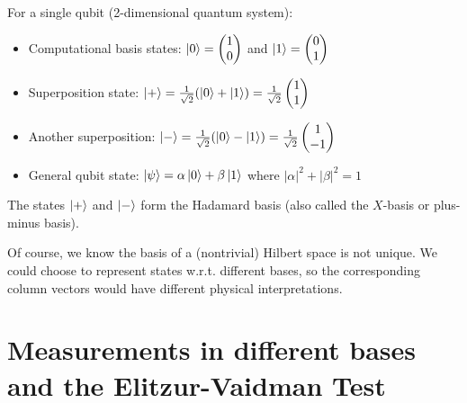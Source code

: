 \begin{example}
For a single qubit (2-dimensional quantum system):
\begin{itemize}
\item Computational basis states: $\ket{0} = \begin{pmatrix} 1 \\ 0 \end{pmatrix}$ and $\ket{1} = \begin{pmatrix} 0 \\ 1 \end{pmatrix}$

\item Superposition state: $\ket{+} = \frac{1}{\sqrt{2}}(\ket{0} + \ket{1}) = \frac{1}{\sqrt{2}}\begin{pmatrix} 1 \\ 1 \end{pmatrix}$

\item Another superposition: $\ket{-} = \frac{1}{\sqrt{2}}(\ket{0} - \ket{1}) = \frac{1}{\sqrt{2}}\begin{pmatrix} 1 \\ -1 \end{pmatrix}$

\item General qubit state: $\ket{\psi} = \alpha\ket{0} + \beta\ket{1}$ where $|\alpha|^2 + |\beta|^2 = 1$
\end{itemize}
The states $\ket{+}$ and $\ket{-}$ form the Hadamard basis (also called the $X$-basis or plus-minus basis).
\end{example}

Of course, we know the basis of a (nontrivial) Hilbert space is not unique. We could choose to represent states w.r.t. different bases, so the corresponding column vectors would have different physical interpretations.

\section{Measurements in different bases and the Elitzur-Vaidman Test}
